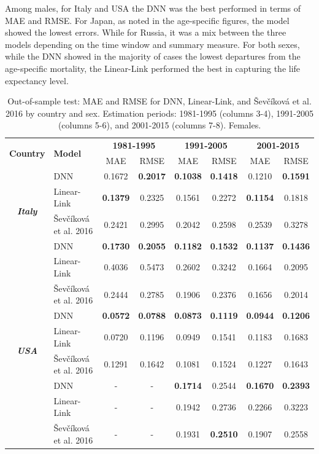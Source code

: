 \documentclass[a4,11pt]{article}
\begin{document}
Among males, for Italy and USA the DNN was the best performed in terms of MAE and RMSE. For Japan, as noted in the age-specific figures, the \citet{Sevcikova} model showed the lowest errors. While for Russia, it was a mix between the three models depending on the time window and summary measure. For both sexes, while the DNN showed in the majority of cases the lowest departures from the age-specific mortality, the Linear-Link performed the best in capturing the life expectancy level.


\begin{table}[H]
		\centering
		\caption{Out-of-sample test: MAE and RMSE for DNN, Linear-Link, and \v{S}ev\v{c}\'{i}kov\'{a} et al. 2016 by country and sex. Estimation periods: 1981-1995 (columns 3-4), 1991-2005 (columns 5-6), and 2001-2015 (columns 7-8). Females.}
		\label{tab:1}
			\footnotesize	
		\begin{tabular}{cl|cc|cc|cc}
			\hline 		
			\multirow{2}{*}{\textbf{Country}} & \multirow{2}{*}{\textbf{Model}} & \multicolumn{2}{c|}{\textbf{1981-1995}} & \multicolumn{2}{c}{\textbf{1991-2005}} & \multicolumn{2}{c}{\textbf{2001-2015}}\tabularnewline
			\cline{3-8} 
			& & MAE & RMSE & MAE & RMSE & MAE & RMSE\tabularnewline
			\hline 
			\multirow{4}{*}{\textbf{\textit{Italy}}} & \multirow{1}{*}{DNN} &0.1672& \textbf{0.2017}&\textbf{0.1038}& \textbf{0.1418}&0.1210& \textbf{0.1591} \tabularnewline
			& \multirow{1}{*}{Linear-Link} &\textbf{0.1379}& 0.2325& 0.1561 &0.2272&\textbf{0.1154}& 0.1818 \tabularnewline
      & \multirow{1}{*}{\v{S}ev\v{c}\'{i}kov\'{a} et al. 2016} &0.2421&0.2995& 0.2042 &0.2598& 0.2539& 0.3278 \tabularnewline
      \hline 
			\multirow{4}{*}{\textbf{\textit{Japan}}} & \multirow{1}{*}{DNN} &\textbf{0.1730}& \textbf{0.2055}& \textbf{0.1182}& \textbf{0.1532}&\textbf{0.1137}&\textbf{ 0.1436}\tabularnewline
			& \multirow{1}{*}{Linear-Link} &0.4036& 0.5473& 0.2602& 0.3242&0.1664& 0.2095 \tabularnewline
      & \multirow{1}{*}{\v{S}ev\v{c}\'{i}kov\'{a} et al. 2016}&0.2444& 0.2785 & 0.1906& 0.2376&0.1656& 0.2014 \tabularnewline
      \hline 
\multirow{4}{*}{\textbf{\textit{USA}}} &\multirow{1}{*}{DNN} &\textbf{0.0572}&\textbf{ 0.0788}&\textbf{ 0.0873}& \textbf{0.1119}&\textbf{0.0944}& \textbf{0.1206} \tabularnewline
			& \multirow{1}{*}{Linear-Link} &0.0720 &0.1196& 0.0949 &0.1541&0.1183& 0.1683 \tabularnewline
 	 		&\multirow{1}{*}{\v{S}ev\v{c}\'{i}kov\'{a} et al. 2016} &0.1291 &0.1642& 0.1081 &0.1524&0.1227& 0.1643\tabularnewline
      \hline 
\multirow{4}{*}{\textbf{\textit{Russia (2014)}}} &\multirow{1}{*}{DNN} &-&-&\textbf{0.1714}&0.2544&\textbf{0.1670}& \textbf{0.2393}\tabularnewline
			& \multirow{1}{*}{Linear-Link} &-&-& 0.1942& 0.2736&0.2266& 0.3223 \tabularnewline
 	 		&\multirow{1}{*}{\v{S}ev\v{c}\'{i}kov\'{a} et al. 2016}&-&-& 0.1931& \textbf{0.2510}&0.1907& 0.2558 \tabularnewline
 	 		\hline 
		\end{tabular}
	\end{table}
%
\end{document}
